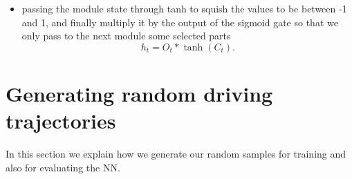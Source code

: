 \documentclass[a4paper,aps,amsmath,amssymb,twocolumn,longbibliography,,accepted=2022-05-17]{quantumarticle}
\begin{document}
\begin{itemize}
{\begin{itemize}
{				\begin{equation}
					\begin{array}{l}
						O_{t}=\sigma\left(W_{o}\left[h_{t-1}, x_{t}\right]+b_{o}\right). \\
					\end{array}
				\end{equation}}
			\item{passing the module state through tanh to squish the values to be between -1 and 1, and finally multiply it by the output of the sigmoid gate so that we only pass to the next module some selected parts
				\begin{equation}
					h_{t}=O_{t} * \tanh \left(C_{t}\right).
				\end{equation}}
		\end{itemize}}
\end{itemize}

\section{Generating random driving trajectories}

In this section we explain how we generate our random samples for training and also for evaluating the NN.

\end{document}
